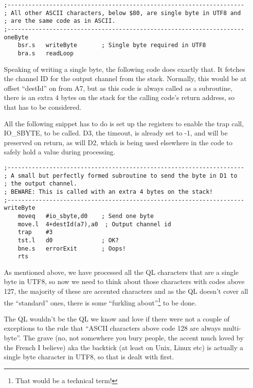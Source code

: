 \begin{lstlisting}[firstnumber=last,caption={Ql2utf8: handling low value ASCII codes}]
;--------------------------------------------------------------------
; All other ASCII characters, below $80, are single byte in UTF8 and
; are the same code as in ASCII.
;--------------------------------------------------------------------
oneByte     
    bsr.s   writeByte       ; Single byte required in UTF8
    bra.s   readLoop
\end{lstlisting}

Speaking of writing a single byte, the following code does exactly
that. It fetches the channel ID for the output channel from the stack.
Normally, this would be at offset ``destId'' on from A7, but as
this code is always called as a subroutine, there is an extra 4 bytes
on the stack for the calling code's return address, so that has to
be considered.

All the following snippet has to do is set up the registers to enable
the trap call, IO\_SBYTE, to be called. D3, the timeout, is already
set to -1, and will be preserved on return, as will D2, which is being
used elsewhere in the code to safely hold a value during processing.

\begin{lstlisting}[firstnumber=last,caption={Ql2utf8: Writing one byte of UTF8}]
;--------------------------------------------------------------------
; A small but perfectly formed subroutine to send the byte in D1 to
; the output channel.
; BEWARE: This is called with an extra 4 bytes on the stack!
;--------------------------------------------------------------------
writeByte
    moveq   #io_sbyte,d0    ; Send one byte
    move.l  4+destId(a7),a0  ; Output channel id
    trap    #3
    tst.l   d0              ; OK?
    bne.s   errorExit       ; Oops!
    rts
\end{lstlisting}

As mentioned above, we have processed all the QL characters that are
a single byte in UTF8, so now we need to think about those characters
with codes above 127, the majority of these are accented characters
and as the QL doesn't cover all the ``standard'' ones, there is
some ``furkling about''\footnote{That would be a technical term!}
to be done.

The QL wouldn't be the QL we know and love if there were not a couple
of exceptions to the rule that ``ASCII characters above code 128
are always multi-byte''. The grave (no, not somewhere you bury people,
the accent much loved by the French I believe) aka the backtick (at
least on Unix, Linux etc) is actually a single byte character in UTF8,
so that is dealt with first.


